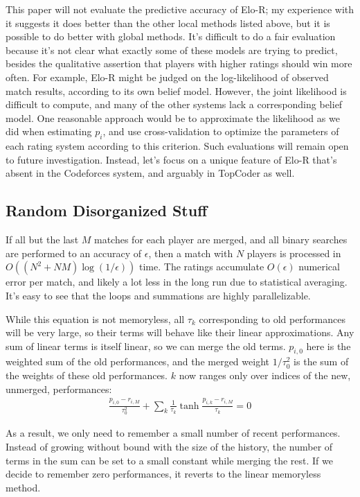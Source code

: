 \documentclass{article}
\begin{document}
This paper will not evaluate the predictive accuracy of Elo-R; my experience with it suggests it does better than the other local methods listed above, but it is possible to do better with global methods. It's difficult to do a fair evaluation because it's not clear what exactly some of these models are trying to predict, besides the qualitative assertion that players with higher ratings should win more often. For example, Elo-R might be judged on the log-likelihood of observed match results, according to its own belief model. However, the joint likelihood is difficult to compute, and many of the other systems lack a corresponding belief model. One reasonable approach would be to approximate the likelihood as we did when estimating $p_i$, and use cross-validation to optimize the parameters of each rating system according to this criterion. Such evaluations will remain open to future investigation. Instead, let's focus on a unique feature of Elo-R that's absent in the Codeforces system, and arguably in TopCoder as well.

\subsection{Random Disorganized Stuff}

If all but the last $M$ matches for each player are merged, and all binary searches are performed to an accuracy of $\epsilon$, then a match with $N$ players is processed in $O((N^2+NM)\log(1/\epsilon))$ time. The ratings accumulate $O(\epsilon)$ numerical error per match, and likely a lot less in the long run due to statistical averaging.  It's easy to see that the loops and summations are highly parallelizable.

While this equation is not memoryless, all $\tau_k$ corresponding to old performances will be very large, so their terms will behave like their linear approximations. Any sum of linear terms is itself linear, so we can merge the old terms. $p_{i,0}$ here is the weighted sum of the old performances, and the merged weight $1/\tau_0^2$ is the sum of the weights of these old performances. $k$ now ranges only over indices of the new, unmerged, performances:
\begin{align}
\frac{p_{i,0} - r_{i,M}}{\tau_0^2} + \sum_k \frac {1}{\tau_k} \tanh\frac{p_{i,k} - r_{i,M}}{\tau_k} = 0
\end{align}

As a result, we only need to remember a small number of recent performances. Instead of growing without bound with the size of the history, the number of terms in the sum can be set to a small constant while merging the rest. If we decide to remember zero performances, it reverts to the linear memoryless method. 
\end{document}
